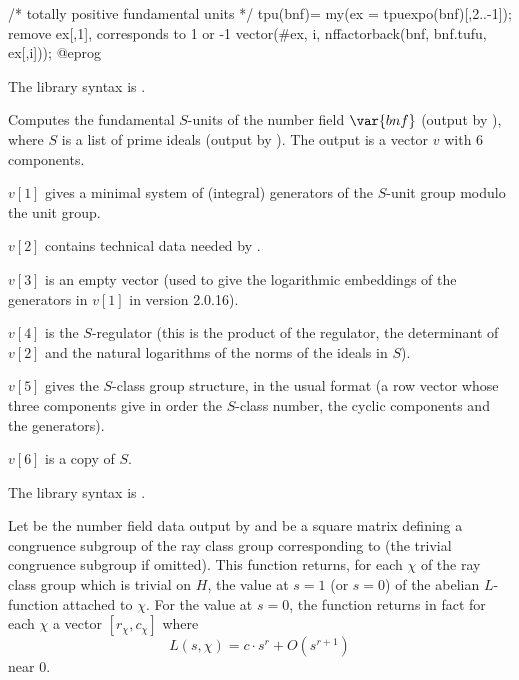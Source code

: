 /* totally positive fundamental units */
tpu(bnf)=
{ my(ex = tpuexpo(bnf)[,2..-1]); \\ remove ex[,1], corresponds to 1 or -1
  vector(#ex, i, nffactorback(bnf, bnf.tufu, ex[,i]));
}
@eprog

The library syntax is .

\label{se:bnfsunit}
Computes the fundamental $S$-units of the
number field $\var{bnf}$ (output by ), where $S$ is a list of
prime ideals (output by ). The output is a vector $v$ with
6 components.

$v[1]$ gives a minimal system of (integral) generators of the $S$-unit group
modulo the unit group.

$v[2]$ contains technical data needed by .

$v[3]$ is an empty vector (used to give the logarithmic embeddings of the
generators in $v[1]$ in version 2.0.16).

$v[4]$ is the $S$-regulator (this is the product of the regulator, the
determinant of $v[2]$ and the natural logarithms of the norms of the ideals
in $S$).

$v[5]$ gives the $S$-class group structure, in the usual format
(a row vector whose three components give in order the $S$-class number,
the cyclic components and the generators).

$v[6]$ is a copy of $S$.

The library syntax is .

\label{se:bnrL1}
Let  be the number field data output by  and
 be a square matrix defining a congruence subgroup of the
ray class group corresponding to  (the trivial congruence subgroup
if omitted). This function returns, for each  $\chi$ of the ray
class group which is trivial on $H$, the value at $s = 1$ (or $s = 0$) of the
abelian $L$-function attached to $\chi$. For the value at $s = 0$, the
function returns in fact for each $\chi$ a vector $[r_\chi, c_\chi]$ where
$$L(s, \chi) = c \cdot s^r + O(s^{r + 1})$$
\noindent near $0$.

